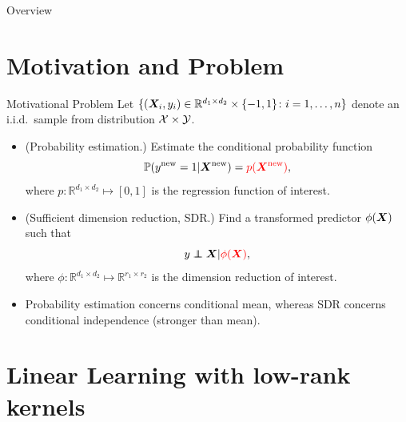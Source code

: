 \documentclass[compress,dvipsnames]{beamer}
\let\olditem\item
\renewcommand\item{\olditem\justifying}
\newcommand{\ind}{\perp\!\!\!\!\perp}
\begin{document}
\begin{frame}{Overview}
\tableofcontents
\end{frame}

\section{Motivation and Problem}
\begin{frame}{Motivational Problem}
Let $\{ (\bm{X}_i, y_i) \in \mathbb{R}^{d_1\times d_2}\times \{-1,1\}\colon i=1,\ldots,n\}$ denote an i.i.d.\ sample from distribution ${\mathcal X}\times {\mathcal Y}$. 
\begin{itemize}
\item (Probability estimation.) Estimate the conditional probability function
\[
\mathbb{P}(y^{\text{new}}=1|\bm{X}^{\text{new}})={\color{red}p(\bm{X}^{\text{new}})},
\]
where $p\colon \mathbb{R}^{d_1\times d_2}\mapsto [0,1]$ is the regression function of interest. 
\item (Sufficient dimension reduction, SDR.) Find a transformed predictor $\phi(\bm{X})$ such that
\[
y \ind \mX \large|{\color{red}\phi(\mX)},
\]
where $\phi\colon \mathbb{R}^{d_1\times d_2}\mapsto \mathbb{R}^{r_1\times r_2}$ is the dimension reduction of interest. 
\item Probability estimation concerns {\color{red}conditional mean}, whereas SDR concerns {\color{red}conditional independence} (stronger than mean). 
\end{itemize}
\end{frame}

\section{Linear Learning with low-rank kernels}
\end{document}
